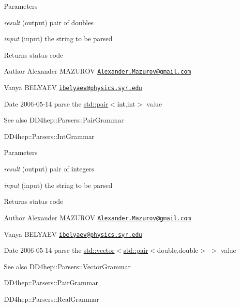 \begin{DoxyParams}{Parameters}
\item[{\em result}](output) pair of doubles \item[{\em input}](input) the string to be parsed \end{DoxyParams}
\begin{DoxyReturn}{Returns}
status code
\end{DoxyReturn}
\begin{DoxyAuthor}{Author}
Alexander MAZUROV \href{mailto:Alexander.Mazurov@gmail.com}{\tt Alexander.Mazurov@gmail.com} 

Vanya BELYAEV \href{mailto:ibelyaev@physics.syr.edu}{\tt ibelyaev@physics.syr.edu} 
\end{DoxyAuthor}
\begin{DoxyDate}{Date}
2006-\/05-\/14 parse the {\ttfamily \hyperlink{classstd_1_1pair}{std::pair}$<$int,int$>$} value
\end{DoxyDate}
\begin{DoxySeeAlso}{See also}
DD4hep::Parsers::PairGrammar 

DD4hep::Parsers::IntGrammar 
\end{DoxySeeAlso}

\begin{DoxyParams}{Parameters}
\item[{\em result}](output) pair of integers \item[{\em input}](input) the string to be parsed \end{DoxyParams}
\begin{DoxyReturn}{Returns}
status code
\end{DoxyReturn}
\begin{DoxyAuthor}{Author}
Alexander MAZUROV \href{mailto:Alexander.Mazurov@gmail.com}{\tt Alexander.Mazurov@gmail.com} 

Vanya BELYAEV \href{mailto:ibelyaev@physics.syr.edu}{\tt ibelyaev@physics.syr.edu} 
\end{DoxyAuthor}
\begin{DoxyDate}{Date}
2006-\/05-\/14 parse the {\ttfamily \hyperlink{classstd_1_1vector}{std::vector}$<$\hyperlink{classstd_1_1pair}{std::pair}$<$double,double$>$ $>$} value 
\end{DoxyDate}
\begin{DoxySeeAlso}{See also}
DD4hep::Parsers::VectorGrammar 

DD4hep::Parsers::PairGrammar 

DD4hep::Parsers::RealGrammar 
\end{DoxySeeAlso}

